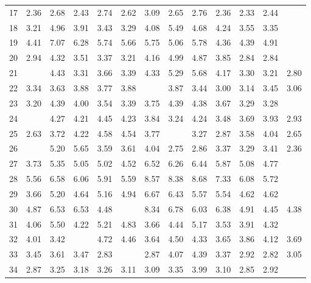 \begin{tabular}{rrrrrrrrrrrrr}
  17 & 2.36 & 2.68 & 2.43 & 2.74 & 2.62 & 3.09 & 2.65 & 2.76 & 2.36 & 2.33 & 2.44 & \color{blue}{2.06} \\ 
  18 & 3.21 & 4.96 & 3.91 & 3.43 & 3.29 & 4.08 & 5.49 & 4.68 & 4.24 & 3.55 & 3.35 & \color{blue}{2.91} \\ 
  19 & 4.41 & 7.07 & 6.28 & 5.74 & 5.66 & 5.75 & 5.06 & 5.78 & 4.36 & 4.39 & 4.91 & \color{blue}{3.96} \\ 
  20 & 2.94 & 4.32 & 3.51 & 3.37 & 3.21 & 4.16 & 4.99 & 4.87 & 3.85 & 2.84 & 2.84 & \color{blue}{2.52} \\ 
  21 & \color{blue}{2.69} & 4.43 & 3.31 & 3.66 & 3.39 & 4.33 & 5.29 & 5.68 & 4.17 & 3.30 & 3.21 & 2.80 \\ 
  22 & 3.34 & 3.63 & 3.88 & 3.77 & 3.88 & \color{blue}{2.72} & 3.87 & 3.44 & 3.00 & 3.14 & 3.45 & 3.06 \\ 
  23 & 3.20 & 4.39 & 4.00 & 3.54 & 3.39 & 3.75 & 4.39 & 4.38 & 3.67 & 3.29 & 3.28 & \color{blue}{2.93} \\ 
  24 & \color{blue}{2.65} & 4.27 & 4.21 & 4.45 & 4.23 & 3.84 & 3.24 & 4.24 & 3.48 & 3.69 & 3.93 & 2.93 \\ 
  25 & 2.63 & 3.72 & 4.22 & 4.58 & 4.54 & 3.77 & \color{blue}{2.43} & 3.27 & 2.87 & 3.58 & 4.04 & 2.65 \\ 
  26 & \color{blue}{2.35} & 5.20 & 5.65 & 3.59 & 3.61 & 4.04 & 2.75 & 2.86 & 3.37 & 3.29 & 3.41 & 2.36 \\ 
  27 & 3.73 & 5.35 & 5.05 & 5.02 & 4.52 & 6.52 & 6.26 & 6.44 & 5.87 & 5.08 & 4.77 & \color{blue}{3.69} \\ 
  28 & 5.56 & 6.58 & 6.06 & 5.91 & 5.59 & 8.57 & 8.38 & 8.68 & 7.33 & 6.08 & 5.72 & \color{blue}{4.94} \\ 
  29 & 3.66 & 5.20 & 4.64 & 5.16 & 4.94 & 6.67 & 6.43 & 5.57 & 5.54 & 4.62 & 4.62 & \color{blue}{3.50} \\ 
  30 & 4.87 & 6.53 & 6.53 & 4.48 & \color{blue}{4.26} & 8.34 & 6.78 & 6.03 & 6.38 & 4.91 & 4.45 & 4.38 \\ 
  31 & 4.06 & 5.50 & 4.22 & 5.21 & 4.83 & 3.66 & 4.44 & 5.17 & 3.53 & 3.91 & 4.32 & \color{blue}{3.40} \\ 
  32 & 4.01 & 3.42 & \color{blue}{3.32} & 4.72 & 4.46 & 3.64 & 4.50 & 4.33 & 3.65 & 3.86 & 4.12 & 3.69 \\ 
  33 & 3.45 & 3.61 & 3.47 & 2.83 & \color{blue}{2.82} & 2.87 & 4.07 & 4.39 & 3.37 & 2.92 & 2.82 & 3.05 \\ 
  34 & 2.87 & 3.25 & 3.18 & 3.26 & 3.11 & 3.09 & 3.35 & 3.99 & 3.10 & 2.85 & 2.92 & \color{blue}{2.72} \\ 

\end{tabular}

